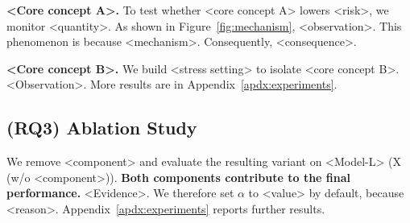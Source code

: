 \textbf{<Core concept A>.} To test whether <core concept A> lowers <risk>, we monitor <quantity>.
As shown in Figure~\ref{fig:mechanism}, <observation>. This phenomenon is because <mechanism>. Consequently, <consequence>.

\textbf{<Core concept B>.} We build <stress setting> to isolate <core concept B>. <Observation>. More results are in Appendix~\ref{apdx:experiments}.

\subsection{(RQ3) Ablation Study} \label{sec:ablation}
We remove <component> and evaluate the resulting variant on <Model-L> (\ie X (w/o <component>)).
\textbf{\draft{[Expected]} Both components contribute to the final performance.} <Evidence>.
We therefore set $\alpha$ to <value> by default, because <reason>. Appendix~\ref{apdx:experiments} reports further results.
